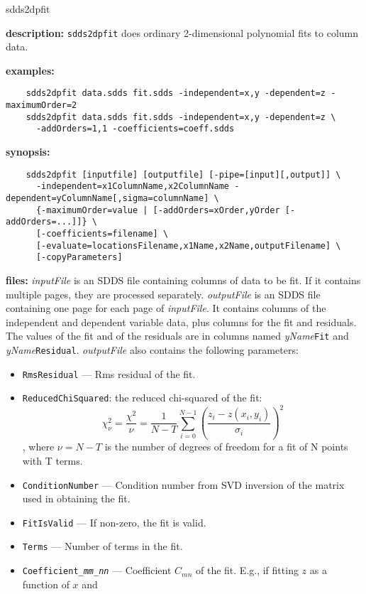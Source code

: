 \begin{sddsprog}{sdds2dpfit}
  \item \textbf{description:} \verb|sdds2dpfit| does ordinary 2-dimensional polynomial fits to column data.
  \item \textbf{examples:}
    \begin{verbatim}
    sdds2dpfit data.sdds fit.sdds -independent=x,y -dependent=z -maximumOrder=2
    sdds2dpfit data.sdds fit.sdds -independent=x,y -dependent=z \
      -addOrders=1,1 -coefficients=coeff.sdds
    \end{verbatim}
  \item \textbf{synopsis:}
    \begin{verbatim}
    sdds2dpfit [inputfile] [outputfile] [-pipe=[input][,output]] \
      -independent=x1ColumnName,x2ColumnName -dependent=yColumnName[,sigma=columnName] \
      {-maximumOrder=value | [-addOrders=xOrder,yOrder [-addOrders=...]]} \
      [-coefficients=filename] \
      [-evaluate=locationsFilename,x1Name,x2Name,outputFilename] \
      [-copyParameters]
    \end{verbatim}
  \item \textbf{files:}
    \emph{inputFile} is an SDDS file containing columns of data to be fit. If it contains multiple pages, they are processed
    separately. \emph{outputFile} is an SDDS file containing one page for each page of \emph{inputFile}. It contains columns of
    the independent and dependent variable data, plus columns for the fit and residuals. The values of the fit
    and of the residuals are in columns named \emph{yName}{\tt Fit} and \emph{yName}{\tt Residual}. \emph{outputFile} also contains
    the following parameters:
    \begin{itemize}
      \item {\tt RmsResidual} --- Rms residual of the fit.
      \item {\tt ReducedChiSquared}: the reduced chi-squared of the fit:
        $$ \chi^2_\nu = \frac{\chi^2}{\nu} = \frac{1}{N-T}\sum_{i=0}^{N-1} \left(\frac{z_i - z(x_i, y_i)}{\sigma_i}\right)^2 $$,
        where $\nu = N-T$ is the number of degrees of freedom for a fit of N points with T terms.
      \item {\tt ConditionNumber} --- Condition number from SVD inversion of the matrix used in obtaining the fit.
      \item {\tt FitIsValid} --- If non-zero, the fit is valid.
      \item {\tt Terms} --- Number of terms in the fit.
      \item {\tt Coefficient_{\em mm}_{\em nn}} --- Coefficient $C_{mn}$ of the fit. E.g., if fitting $z$ as a function of $x$ and

\end{itemize}
\end{sddsprog}
